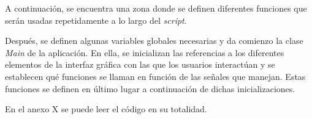 \documentclass[11pt,a4paper,twoside]{book}
\begin{document}
                A continuación, se encuentra una zona donde se definen diferentes funciones que serán usadas repetidamente a lo largo del \textit{script}. 
                
                Después, se definen algunas variables globales necesarias y da comienzo la clase \textit{Main} de la aplicación. En ella, se inicializan las referencias a los diferentes elementos de la interfaz gráfica con las que los usuarios interactúan y se establecen qué funciones se llaman en función de las señales que manejan. Estas funciones se definen en último lugar a continuación de dichas inicializaciones.
                
                En el anexo X se puede leer el código en su totalidad.
               
        
\end{document}

